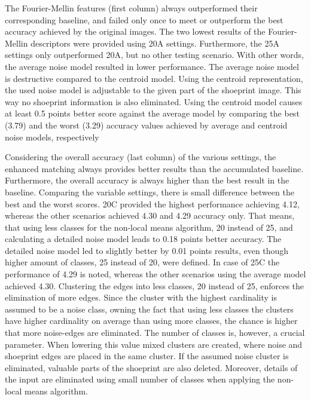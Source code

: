 \documentclass[draft,final]{vutinfth} %
\begin{document}
\par
The Fourier-Mellin features (first column) always outperformed their corresponding baseline, and failed only once to meet or outperform the best accuracy achieved by the original images.
The two lowest results of the Fourier-Mellin descriptors were provided using 20A settings.
Furthermore, the 25A settings only outperformed 20A, but no other testing scenario.
With other words, the average noise model resulted in lower performance.
The average noise model is destructive compared to the centroid model.
Using the centroid representation, the used noise model is adjustable to the given part of the shoeprint image.
This way no shoeprint information is also eliminated. 
Using the centroid model causes at least 0.5 points better score against the average model by comparing the best (3.79) and the worst (3.29)  accuracy values achieved by average and centroid noise models, respectively 
\par
Considering the overall accuracy (last column) of the various settings, the enhanced matching always provides better results than the accumulated baseline.
Furthermore, the overall accuracy is always higher than the best result in the baseline.
Comparing the variable settings, there is small difference between the best and the worst scores.
20C provided the highest performance achieving 4.12, whereas the other scenarios achieved 4.30 and 4.29 accuracy only. 
That means, that using less classes for the non-local means algorithm, 20 instead of 25, and calculating a detailed noise model leads to 0.18 points better accuracy.
The detailed noise model led to slightly better by 0.01 points results, even though higher amount of classes, 25 instead of 20, were defined.
In case of 25C the performance of 4.29 is noted, whereas the other scenarios using the average model achieved 4.30.
Clustering the edges into less classes, 20 instead of 25, enforces the elimination of more edges.
Since the cluster with the highest cardinality is assumed to be a noise class, owning the fact that using less classes the clusters have higher cardinality on average than using more classes, the chance is higher that more noise-edges are eliminated.
The number of classes is, however, a crucial parameter.
When lowering this value mixed clusters are created, where noise and shoeprint edges are placed in the same cluster.
If the assumed noise cluster is eliminated, valuable parts of the shoeprint are also deleted.
Moreover, details of the input are eliminated using small number of classes when applying the non-local means algorithm.
\end{document}
